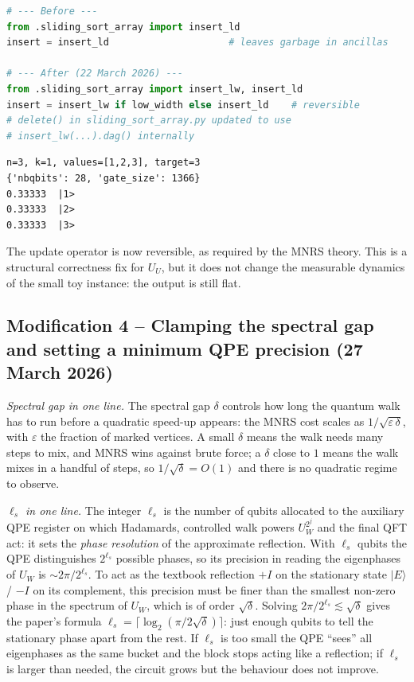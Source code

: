 \documentclass[11pt,a4paper]{article}
\begin{document}
\begin{lstlisting}[language=Python]
# --- Before ---
from .sliding_sort_array import insert_ld
insert = insert_ld                     # leaves garbage in ancillas

# --- After (22 March 2026) ---
from .sliding_sort_array import insert_lw, insert_ld
insert = insert_lw if low_width else insert_ld    # reversible
# delete() in sliding_sort_array.py updated to use
# insert_lw(...).dag() internally
\end{lstlisting}

\begin{lstlisting}[style=plain]
n=3, k=1, values=[1,2,3], target=3
{'nbqbits': 28, 'gate_size': 1366}
0.33333  |1>
0.33333  |2>
0.33333  |3>
\end{lstlisting}

The update operator is now reversible, as required by the MNRS theory.
This is a structural correctness fix for $U_U$, but it does not change
the measurable dynamics of the small toy instance: the output is still
flat.

\subsection*{Modification 4 -- Clamping the spectral gap and setting a
minimum QPE precision (27 March 2026)}

\emph{Spectral gap in one line.} The spectral gap $\delta$ controls
how long the quantum walk has to run before a quadratic speed-up
appears: the MNRS cost scales as $1/\sqrt{\varepsilon\,\delta}$, with
$\varepsilon$ the fraction of marked vertices. A small $\delta$ means
the walk needs many steps to mix, and MNRS wins against brute force;
a $\delta$ close to $1$ means the walk mixes in a handful of steps, so
$1/\sqrt{\delta} = O(1)$ and there is no quadratic regime to observe.

\emph{$\ell_s$ in one line.} The integer $\ell_s$ is the number of
qubits allocated to the auxiliary QPE register on which Hadamards,
controlled walk powers $U_W^{2^j}$ and the final QFT act: it sets
the \emph{phase resolution} of the approximate reflection. With
$\ell_s$ qubits the QPE distinguishes $2^{\ell_s}$ possible phases,
so its precision in reading the eigenphases of $U_W$ is $\sim 2\pi /
2^{\ell_s}$. To act as the textbook reflection $+I$ on the stationary
state $|E\rangle$ / $-I$ on its complement, this precision must be
finer than the smallest non-zero phase in the spectrum of $U_W$,
which is of order $\sqrt{\delta}$. Solving $2\pi / 2^{\ell_s}
\lesssim \sqrt{\delta}$ gives the paper's formula $\ell_s =
\lceil \log_2(\pi / 2\sqrt{\delta})\rceil$: just enough qubits to
tell the stationary phase apart from the rest. If $\ell_s$ is too
small the QPE ``sees'' all eigenphases as the same bucket and the
block stops acting like a reflection; if $\ell_s$ is larger than
needed, the circuit grows but the behaviour does not improve.
\end{document}

